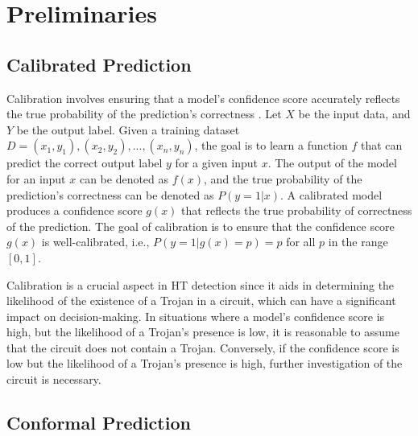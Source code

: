 \section*{Preliminaries}
\label{Sec:Prelem}

\subsection*{Calibrated Prediction}
\label{sec:Calibration}
Calibration involves ensuring that a model's confidence score accurately reflects the true probability of the prediction's correctness \cite{ovadia2019can}. Let $X$ be the input data, and $Y$ be the output label. Given a training dataset $D = {(x_1, y_1), (x_2, y_2),..., (x_n, y_n)}$, the goal is to learn a function $f$ that can predict the correct output label $y$ for a given input $x$. The output of the model for an input $x$ can be denoted as $f(x)$, and the true probability of the prediction's correctness can be denoted as $P(y=1|x)$. A calibrated model produces a confidence score $g(x)$ that reflects the true probability of correctness of the prediction. The goal of calibration is to ensure that the confidence score $g(x)$ is well-calibrated, i.e., $P(y=1|g(x)=p) = p$ for all $p$ in the range $[0, 1]$.

Calibration is a crucial aspect in HT detection since it aids in determining the likelihood of the existence of a Trojan in a circuit, which can have a significant impact on decision-making. In situations where a model's confidence score is high, but the likelihood of a Trojan's presence is low, it is reasonable to assume that the circuit does not contain a Trojan. Conversely, if the confidence score is low but the likelihood of a Trojan's presence is high, further investigation of the circuit is necessary.

\subsection*{Conformal Prediction}
\label{sec:CP}

